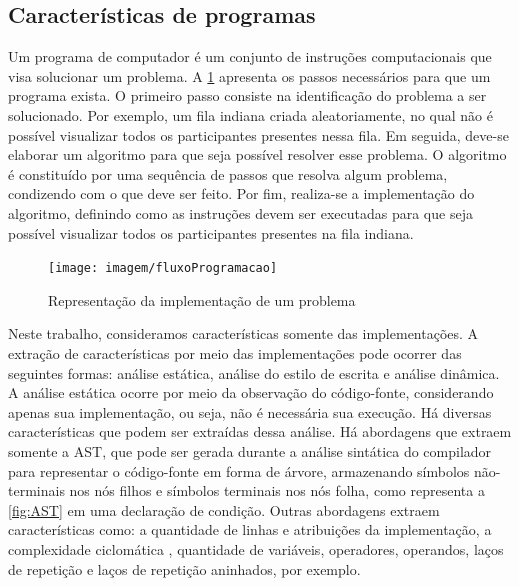 		\subsection{Características de programas}
		\label{subSec:Caracteristicas}
			
			Um programa de computador é um conjunto de instruções computacionais que visa
			solucionar um problema. A \cref{fig:fluxoProgramacao} apresenta os passos
			necessários para que um programa exista. O primeiro passo consiste na
			identificação do problema a ser solucionado. Por exemplo, um fila indiana
			criada aleatoriamente, no qual não é possível visualizar todos os participantes
			presentes nessa fila. Em seguida, deve-se elaborar um algoritmo para que seja
			possível resolver esse problema. O algoritmo é constituído por uma sequência
			de passos que resolva algum problema, condizendo com o que deve ser feito.
			Por fim, realiza-se a implementação do algoritmo, definindo como as instruções
			devem ser executadas para que seja possível visualizar todos os participantes
			presentes na fila indiana.

			\begin{figure}[h]
				\centering
				\texttt{[image: imagem/fluxoProgramacao]}
				\caption{Representação da implementação de um problema}
				\label{fig:fluxoProgramacao}
			\end{figure}
			
			Neste trabalho, consideramos características somente das implementações.
			A extração de características por meio das implementações pode ocorrer das
			seguintes formas: análise estática, análise do estilo de escrita e análise dinâmica.
			A análise estática ocorre por meio da observação do código-fonte, considerando
			apenas sua implementação, ou seja, não é necessária sua execução. Há diversas
			características que podem ser extraídas dessa análise. Há abordagens que extraem
			somente a \ac{AST}, que pode ser gerada durante a análise
			sintática do compilador para representar o código-fonte em forma de árvore,
			armazenando símbolos não-terminais nos nós filhos e símbolos terminais nos
			nós folha, como representa a \cref{fig:AST} em uma declaração de condição.
			Outras abordagens extraem características como: a quantidade de linhas e
			atribuições da implementação, a complexidade ciclomática \cite{mccabe},
			quantidade de variáveis, operadores, operandos, laços de repetição e laços
			de repetição aninhados, por exemplo.
						
